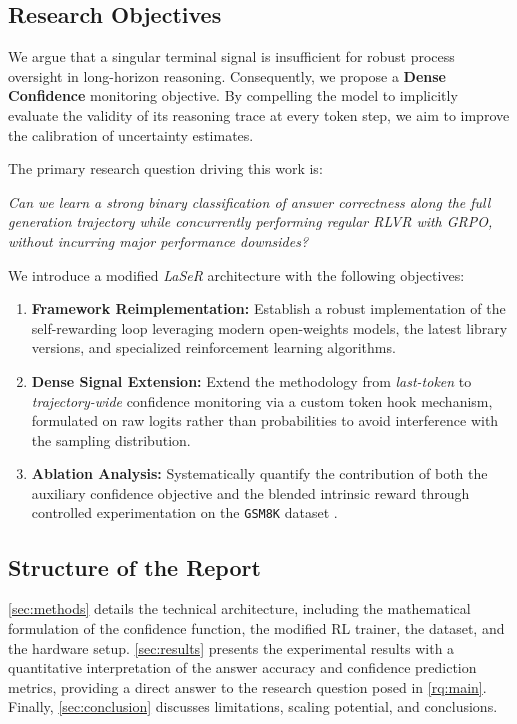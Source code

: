 \documentclass[a4paper,oneside,10pt,ngerman,english]{scrartcl}
\begin{document}
\subsection{Research Objectives}
We argue that a singular terminal signal is insufficient for robust process oversight in long-horizon reasoning. Consequently, we propose a \textbf{Dense Confidence} monitoring objective. By compelling the model to implicitly evaluate the validity of its reasoning trace at every token step, we aim to improve the calibration of uncertainty estimates.

The primary research question driving this work is:
\begin{center}
	\textit{\label{rq:main}Can we learn a strong binary classification of answer correctness along the full generation trajectory while concurrently performing regular RLVR with GRPO, without incurring major performance downsides?}
\end{center}

We introduce a modified \textit{LaSeR} architecture with the following objectives:
\begin{enumerate}
	\item \textbf{Framework Reimplementation:} Establish a robust implementation of the self-rewarding loop leveraging modern open-weights models, the latest library versions, and specialized reinforcement learning algorithms.
	\item \textbf{Dense Signal Extension:} Extend the methodology from \textit{last-token} to \textit{trajectory-wide} confidence monitoring via a custom token hook mechanism, formulated on raw logits rather than probabilities to avoid interference with the sampling distribution.
	\item \textbf{Ablation Analysis:} Systematically quantify the contribution of both the auxiliary confidence objective and the blended intrinsic reward through controlled experimentation on the \texttt{GSM8K} dataset \citep{gsm8k}.
\end{enumerate}

\subsection{Structure of the Report}
\autoref{sec:methods} details the technical architecture, including the mathematical formulation of the confidence function, the modified RL trainer, the dataset, and the hardware setup. \autoref{sec:results} presents the experimental results with a quantitative interpretation of the answer accuracy and confidence prediction metrics, providing a direct answer to the research question posed in \autoref{rq:main}. Finally, \autoref{sec:conclusion} discusses limitations, scaling potential, and conclusions.
\end{document}
